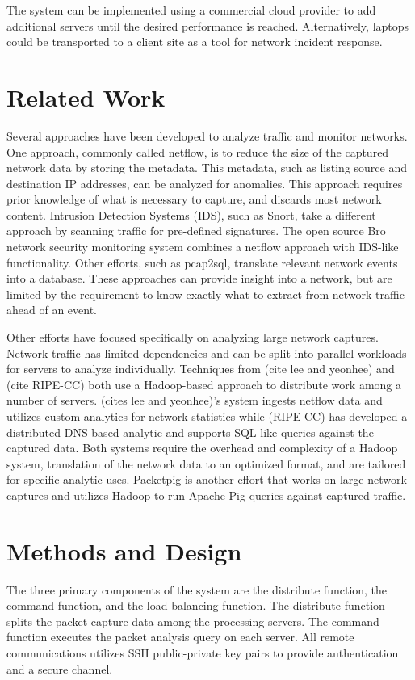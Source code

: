 \documentclass{article}
\begin{document}
\begin{multicols}{2}
The system can be implemented using a commercial cloud provider to add additional servers until the desired performance is reached. Alternatively, laptops could be transported to a client site as a tool for network incident response.

\section*{Related Work}

Several approaches have been developed to analyze traffic and monitor networks. One approach, commonly called netflow, is to reduce the size of the captured network data by storing the metadata. This metadata, such as listing source and destination IP addresses, can be analyzed for anomalies.  This approach requires prior knowledge of what is necessary to capture, and discards most network content. Intrusion Detection Systems (IDS), such as Snort, take a different approach by scanning traffic for pre-defined signatures. The open source Bro network security monitoring system combines a netflow approach with IDS-like functionality.  Other efforts, such as pcap2sql, translate relevant network events into a database. These approaches can provide insight into a network, but are limited by the requirement to know exactly what to extract from network traffic ahead of an event. 

Other efforts have focused specifically on analyzing large network captures. Network traffic has limited dependencies and can be split into parallel workloads for servers to analyze individually.  Techniques from (cite lee and yeonhee) and (cite RIPE-CC) both use a Hadoop-based approach to distribute work among a number of servers.  (cites lee and yeonhee)'s system ingests netflow data and utilizes custom analytics for network statistics while (RIPE-CC) has developed a distributed DNS-based analytic and supports SQL-like queries against the captured data.  Both systems require the overhead and complexity of a Hadoop system, translation of the network data to an optimized format, and are tailored for specific analytic uses.  Packetpig is another effort that works on large network captures and utilizes Hadoop to run Apache Pig queries against captured traffic. 

\section*{Methods and Design}

The three primary components of the system are the distribute function, the command function, and the load balancing function. The distribute function splits the packet capture data among the processing servers. The command function executes the packet analysis query on each server.  All remote communications utilizes SSH public-private key pairs to provide authentication and a secure channel.  


\end{multicols}
\end{document}
